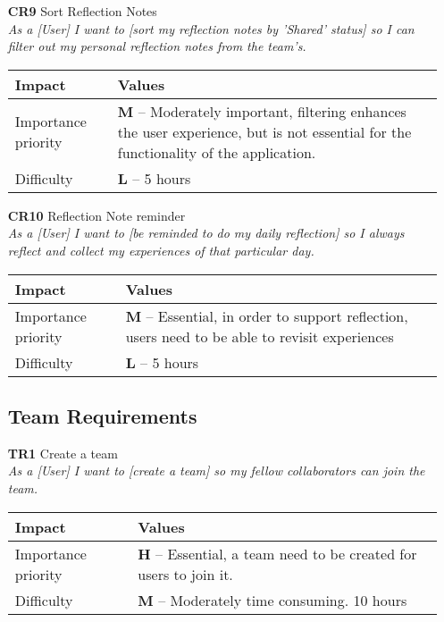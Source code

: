 \begin{itemize}
    \item[\textbf{CR9}] Sort Reflection Notes\\
        \textit{\small{As a [User] I want to [sort my reflection notes by 'Shared' status] so I can filter out my personal reflection notes from the team's.}}

        \begin{tabular}{| l | p{8cm} |}
            \hline
            \rowcolor[gray]{0.8}
            \textbf{Impact} & \textbf{Values} \\
            \hline
            Importance priority & \textbf{M} -- Moderately important, filtering enhances the user experience, but is not essential for the functionality of the application.\\
            Difficulty & \textbf{L} -- 5 hours\\
            \hline
        \end{tabular}
    \vspace{0.5cm}

    \item[\textbf{CR10}] Reflection Note reminder\\
        \textit{\small{As a [User] I want to [be reminded to do my daily reflection] so I always reflect and collect my experiences of that particular day.}}

        \begin{tabular}{| l | p{8cm} |}
            \hline
            \rowcolor[gray]{0.8}
            \textbf{Impact} & \textbf{Values} \\
            \hline
            Importance priority & \textbf{M} -- Essential, in order to support reflection, users need to be able to revisit experiences\\
            Difficulty & \textbf{L} -- 5 hours\\
            \hline
        \end{tabular}
    \vspace{0.5cm}

\subsection{Team Requirements}
    \item[\textbf{TR1}] Create a team\\
        \textit{\small{As a [User] I want to [create a team] so my fellow collaborators can join the team.}}

        \begin{tabular}{| l | p{8cm} |}
            \hline
            \rowcolor[gray]{0.8}
            \textbf{Impact} & \textbf{Values} \\
            \hline
            Importance priority & \textbf{H} -- Essential, a team need to be created for users to join it.\\
            Difficulty & \textbf{M} -- Moderately time consuming. 10 hours\\
            \hline
        \end{tabular}
    \vspace{0.5cm}


\end{itemize}
